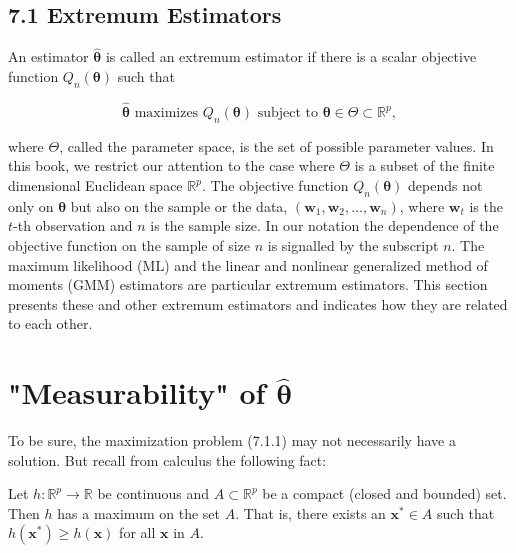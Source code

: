 \documentclass[10pt]{article}
\begin{document}
\subsection*{7.1 Extremum Estimators}
An estimator $\hat{\boldsymbol{\theta}}$ is called an extremum estimator if there is a scalar objective function $Q_{n}(\boldsymbol{\theta})$ such that


\begin{equation*}
\hat{\boldsymbol{\theta}} \text { maximizes } Q_{n}(\boldsymbol{\theta}) \text { subject to } \boldsymbol{\theta} \in \Theta \subset \mathbb{R}^{p}, \tag{7.1.1}
\end{equation*}


where $\Theta$, called the parameter space, is the set of possible parameter values. In this book, we restrict our attention to the case where $\Theta$ is a subset of the finite dimensional Euclidean space $\mathbb{R}^{p}$. The objective function $Q_{n}(\boldsymbol{\theta})$ depends not only on $\boldsymbol{\theta}$ but also on the sample or the data, $\left(\mathbf{w}_{1}, \mathbf{w}_{2}, \ldots, \mathbf{w}_{n}\right)$, where $\mathbf{w}_{t}$ is the $t$-th observation and $n$ is the sample size. In our notation the dependence of the objective function on the sample of size $n$ is signalled by the subscript $n$. The maximum likelihood (ML) and the linear and nonlinear generalized method of moments (GMM) estimators are particular extremum estimators. This section presents these and other extremum estimators and indicates how they are related to each other.

\section*{"Measurability" of $\hat{\boldsymbol{\theta}}$}
To be sure, the maximization problem (7.1.1) may not necessarily have a solution. But recall from calculus the following fact:

Let $h: \mathbb{R}^{p} \rightarrow \mathbb{R}$ be continuous and $A \subset \mathbb{R}^{p}$ be a compact (closed and bounded) set. Then $h$ has a maximum on the set $A$. That is, there exists an $\mathbf{x}^{*} \in A$ such that $h\left(\mathbf{x}^{*}\right) \geq h(\mathbf{x})$ for all $\mathbf{x}$ in $A$.
\end{document}
